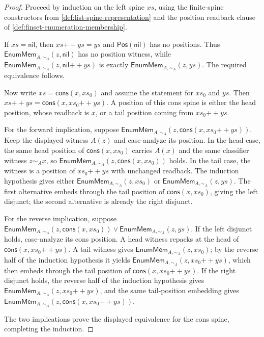 \begin{proof}
Proceed by induction on the left spine $xs$, using the finite-spine constructors from \autoref{def:list-spine-representation} and the position readback clause of \autoref{def:finset-enumeration-membership}.

If $xs=\mathsf{nil}$, then $xs{++}ys=ys$ and $\mathsf{Pos}(\mathsf{nil})$ has no positions. Thus $\mathsf{EnumMem}_{A,\sim_A}(z,\mathsf{nil})$ has no position witness, while $\mathsf{EnumMem}_{A,\sim_A}(z,\mathsf{nil}{++}ys)$ is exactly $\mathsf{EnumMem}_{A,\sim_A}(z,ys)$. The required equivalence follows.

Now write $xs=\mathsf{cons}(x,xs_0)$ and assume the statement for $xs_0$ and $ys$. Then $xs{++}ys=\mathsf{cons}(x,xs_0{++}ys)$. A position of this cons spine is either the head position, whose readback is $x$, or a tail position coming from $xs_0{++}ys$.

For the forward implication, suppose $\mathsf{EnumMem}_{A,\sim_A}(z,\mathsf{cons}(x,xs_0{++}ys))$. Keep the displayed witness $A(z)$ and case-analyze its position. In the head case, the same head position of $\mathsf{cons}(x,xs_0)$ carries $A(x)$ and the same classifier witness $z\sim_A x$, so $\mathsf{EnumMem}_{A,\sim_A}(z,\mathsf{cons}(x,xs_0))$ holds. In the tail case, the witness is a position of $xs_0{++}ys$ with unchanged readback. The induction hypothesis gives either $\mathsf{EnumMem}_{A,\sim_A}(z,xs_0)$ or $\mathsf{EnumMem}_{A,\sim_A}(z,ys)$. The first alternative embeds through the tail position of $\mathsf{cons}(x,xs_0)$, giving the left disjunct; the second alternative is already the right disjunct.

For the reverse implication, suppose $\mathsf{EnumMem}_{A,\sim_A}(z,\mathsf{cons}(x,xs_0))\vee\mathsf{EnumMem}_{A,\sim_A}(z,ys)$. If the left disjunct holds, case-analyze its cons position. A head witness repacks at the head of $\mathsf{cons}(x,xs_0{++}ys)$. A tail witness gives $\mathsf{EnumMem}_{A,\sim_A}(z,xs_0)$; by the reverse half of the induction hypothesis it yields $\mathsf{EnumMem}_{A,\sim_A}(z,xs_0{++}ys)$, which then embeds through the tail position of $\mathsf{cons}(x,xs_0{++}ys)$. If the right disjunct holds, the reverse half of the induction hypothesis gives $\mathsf{EnumMem}_{A,\sim_A}(z,xs_0{++}ys)$, and the same tail-position embedding gives $\mathsf{EnumMem}_{A,\sim_A}(z,\mathsf{cons}(x,xs_0{++}ys))$.

The two implications prove the displayed equivalence for the cons spine, completing the induction.
\end{proof}


